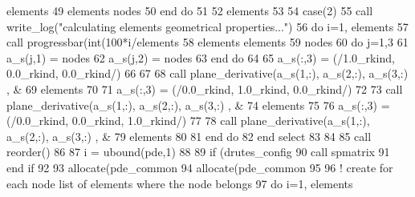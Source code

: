 \begin{DoxyCode}
      elements%
49 \textcolor{comment}{            elements%
      nodes%
50 \textcolor{comment}{}\textcolor{keywordflow}{          end do}
51 
52           elements%
53 
54         \textcolor{keywordflow}{case}(2)
55           \textcolor{keyword}{call }write_log(\textcolor{stringliteral}{"calculating elements geometrical properties..."})
56           \textcolor{keywordflow}{do} i=1, elements%
57             \textcolor{keyword}{call }progressbar(int(100*i/elements%
58             elements%
      elements%
59 \textcolor{comment}{                                nodes%
60 \textcolor{comment}{            }\textcolor{keywordflow}{do} j=1,3
61               a\_s(j,1) = nodes%
62               a\_s(j,2) = nodes%
63 \textcolor{keywordflow}{            end do}
64 
65             a\_s(:,3) = (/1.0\_rkind, 0.0\_rkind, 0.0\_rkind/)
66            
67             
68             \textcolor{keyword}{call }plane_derivative(a\_s(1,:), a\_s(2,:), a\_s(3,:) , &
69                               elements%
70 
71             a\_s(:,3) = (/0.0\_rkind, 1.0\_rkind, 0.0\_rkind/)
72 
73             \textcolor{keyword}{call }plane_derivative(a\_s(1,:), a\_s(2,:), a\_s(3,:) , &
74                               elements%
75 
76             a\_s(:,3) = (/0.0\_rkind, 0.0\_rkind, 1.0\_rkind/)
77 
78             \textcolor{keyword}{call }plane_derivative(a\_s(1,:), a\_s(2,:), a\_s(3,:) , &
79                               elements%
80 
81 \textcolor{keywordflow}{          end do}
82 \textcolor{keywordflow}{      end select}
83 
84       
85       \textcolor{keyword}{call }reorder()
86    
87       i = ubound(pde,1)
88       
89       \textcolor{keywordflow}{if} (drutes_config%
90         \textcolor{keyword}{call }spmatrix%
91 \textcolor{keywordflow}{      end if}
92 
93       \textcolor{keyword}{allocate}(pde_common%
94       \textcolor{keyword}{allocate}(pde_common%
95       
96       \textcolor{comment}{! create for each node list of elements where the node belongs     }
97       \textcolor{keywordflow}{do} i=1, elements%
}}
\end{DoxyCode}
